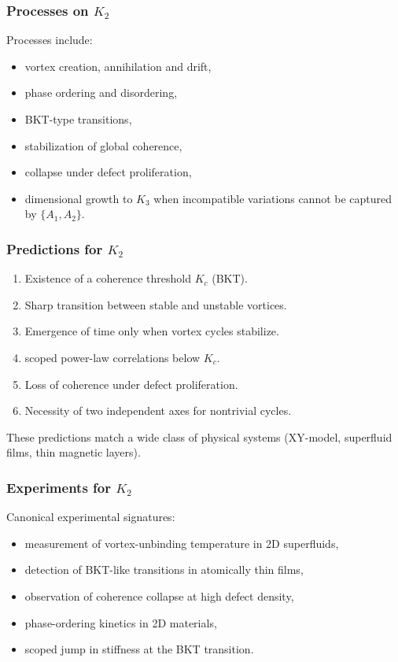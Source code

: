 \subsubsection{Processes on \texorpdfstring{$K_2$}{K_2}}

Processes include:
\begin{itemize}
    \item vortex creation, annihilation and drift,
    \item phase ordering and disordering,
    \item BKT-type transitions,
    \item stabilization of global coherence,
    \item collapse under defect proliferation,
    \item dimensional growth to $K_3$ when incompatible variations
          cannot be captured by $\{A_1, A_2\}$.
\end{itemize}

\subsubsection{Predictions for \texorpdfstring{$K_2$}{K_2}}

\begin{enumerate}
    \item Existence of a coherence threshold $K_c$ (BKT).
    \item Sharp transition between stable and unstable vortices.
    \item Emergence of time only when vortex cycles stabilize.
    \item scoped power-law correlations below $K_c$.
    \item Loss of coherence under defect proliferation.
    \item Necessity of two independent axes for nontrivial cycles.
\end{enumerate}

These predictions match a wide class of physical systems (XY-model,
superfluid films, thin magnetic layers).

\subsubsection{Experiments for \texorpdfstring{$K_2$}{K_2}}

Canonical experimental signatures:
\begin{itemize}
    \item measurement of vortex-unbinding temperature in 2D superfluids,
    \item detection of BKT-like transitions in atomically thin films,
    \item observation of coherence collapse at high defect density,
    \item phase-ordering kinetics in 2D materials,
    \item scoped jump in stiffness at the BKT transition.
\end{itemize}

